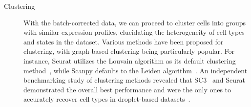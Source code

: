 \begin{description}
	\item[Clustering]
	With the batch-corrected data, we can proceed to cluster cells into groups with similar expression profiles, elucidating the heterogeneity of cell types and states in the dataset. Various methods have been proposed for clustering, with graph-based clustering being particularly popular. For instance, Seurat utilizes the Louvain algorithm as its default clustering method~\citep{stuart2019seurat3}, while Scanpy defaults to the Leiden algorithm~\citep{traag2019louvain}. An independent benchmarking study of clustering methods revealed that SC3~\citep{kiselev2017sc3} and Seurat demonstrated the overall best performance and were the only ones to accurately recover cell types in droplet-based datasets~\citep{duo2018benchclustering}.

\end{description}

